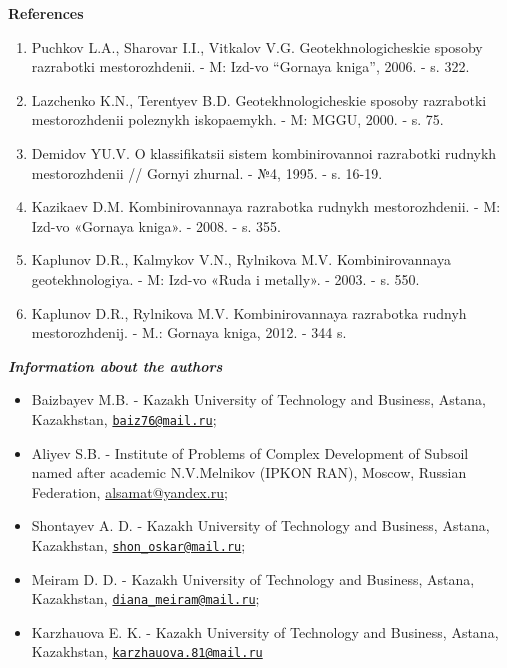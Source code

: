 \begin{center}
{\bfseries References}
\end{center}

\begin{enumerate}
\item
Puchkov L.A., Sharovar I.I., Vitkalov V.G. Geotekhnologicheskie
sposoby razrabotki mestorozhdenii. - M: Izd-vo ``Gornaya kniga'',
2006. - s. 322.

\item
Lazchenko K.N., Terentyev B.D. Geotekhnologicheskie sposoby
razrabotki mestorozhdenii poleznykh iskopaemykh. - M: MGGU, 2000. - s.
75.

\item
Demidov YU.V. O klassifikatsii sistem kombinirovannoi razrabotki
rudnykh mestorozhdenii // Gornyi zhurnal. - №4, 1995. - s. 16-19.

\item
Kazikaev D.M. Kombinirovannaya razrabotka rudnykh mestorozhdenii. -
M: Izd-vo «Gornaya kniga». - 2008. - s. 355.

\item
Kaplunov D.R., Kalmykov V.N., Rylnikova M.V. Kombinirovannaya
geotekhnologiya. - M: Izd-vo «Ruda i metally». - 2003. - s. 550.

\item
Kaplunov D.R., Rylnikova M.V. Kombinirovannaya razrabotka rudnyh
mestorozhdenij. - M.: Gornaya kniga, 2012. - 344 s.
\end{enumerate}

\begin{center}
\emph{{\bfseries Information about the authors}}
\end{center}

\begin{itemize}
\item
Baizbayev M.B. - Kazakh University of Technology and Business, Astana,
Kazakhstan, \href{mailto:baiz76@mail.ru}{\nolinkurl{baiz76@mail.ru}};

\item
Aliyev S.B. - Institute of Problems of Complex Development of Subsoil
named after academic N.V.Melnikov (IPKON RAN), Moscow, Russian
Federation, \href{mailto:baiz76@mail.ru}{alsamat@yandex.ru};

\item
Shontayev A. D. - Kazakh University of Technology and Business, Astana,
Kazakhstan,
\href{mailto:shon_oskar@mail.ru}{\nolinkurl{shon\_oskar@mail.ru}};

\item
Meiram D. D. - Kazakh University of Technology and Business, Astana,
Kazakhstan,
\href{mailto:diana_meiram@mail.ru}{\nolinkurl{diana\_meiram@mail.ru}};

\item
Karzhauova E. K. - Kazakh University of Technology and Business, Astana,
Kazakhstan,
\href{mailto:karzhauova.81@mail.ru}{\nolinkurl{karzhauova.81@mail.ru}}
\end{itemize}

